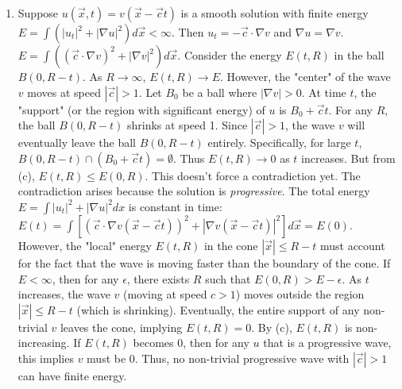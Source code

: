 \begin{solution}
\begin{enumerate}
    \item[(d)] Suppose $u(\vec{x},t) = v(\vec{x}-\vec{c}t)$ is a smooth solution with finite energy $E = \int (|u_t|^2 + |\nabla u|^2) d\vec{x} < \infty$.
    Then $u_t = -\vec{c} \cdot \nabla v$ and $\nabla u = \nabla v$.
    $E = \int ((\vec{c} \cdot \nabla v)^2 + |\nabla v|^2) d\vec{x}$.
    Consider the energy $E(t, R)$ in the ball $B(0, R-t)$. As $R \to \infty$, $E(t, R) \to E$.
    However, the "center" of the wave $v$ moves at speed $|\vec{c}| > 1$.
    Let $B_0$ be a ball where $|\nabla v| > 0$. At time $t$, the "support" (or the region with significant energy) of $u$ is $B_0 + \vec{c}t$.
    For any $R$, the ball $B(0, R-t)$ shrinks at speed 1. Since $|\vec{c}| > 1$, the wave $v$ will eventually leave the ball $B(0, R-t)$ entirely.
    Specifically, for large $t$, $B(0, R-t) \cap (B_0 + \vec{c}t) = \emptyset$. Thus $E(t, R) \to 0$ as $t$ increases.
    But from (c), $E(t, R) \le E(0, R)$. This doesn't force a contradiction yet.
    The contradiction arises because the solution is \textit{progressive}. The total energy $E = \int |u_t|^2 + |\nabla u|^2 dx$ is constant in time: $E(t) = \int [(\vec{c} \cdot \nabla v(\vec{x}-\vec{c}t))^2 + |\nabla v(\vec{x}-\vec{c}t)|^2] d\vec{x} = E(0)$.
    However, the "local" energy $E(t, R)$ in the cone $|\vec{x}| \le R-t$ must account for the fact that the wave is moving faster than the boundary of the cone.
    If $E < \infty$, then for any $\epsilon$, there exists $R$ such that $E(0, R) > E - \epsilon$.
    As $t$ increases, the wave $v$ (moving at speed $c > 1$) moves outside the region $|\vec{x}| \le R-t$ (which is shrinking).
    Eventually, the entire support of any non-trivial $v$ leaves the cone, implying $E(t, R) = 0$.
    By (c), $E(t, R)$ is non-increasing. If $E(t, R)$ becomes 0, then for any $u$ that is a progressive wave, this implies $v$ must be 0.
    Thus, no non-trivial progressive wave with $|\vec{c}| > 1$ can have finite energy.
\end{enumerate}
\end{solution}

